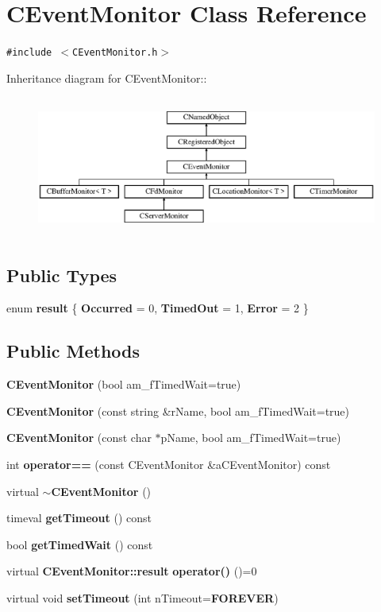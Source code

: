 \section{CEvent\-Monitor  Class Reference}
\label{classCEventMonitor}
{\tt \#include $<$CEvent\-Monitor.h$>$}

Inheritance diagram for CEvent\-Monitor::\begin{figure}[H]
\begin{center}
\leavevmode
\includegraphics[height=4.63576cm]{classCEventMonitor}
\end{center}
\end{figure}
\subsection*{Public Types}
\begin{CompactItemize}
\item 
enum {\bf result} \{ {\bf Occurred} =  0, 
{\bf Timed\-Out} =  1, 
{\bf Error} =  2
 \}
\end{CompactItemize}
\subsection*{Public Methods}
\begin{CompactItemize}
\item 
{\bf CEvent\-Monitor} (bool am\_\-f\-Timed\-Wait=true)
\item 
{\bf CEvent\-Monitor} (const string \&r\-Name, bool am\_\-f\-Timed\-Wait=true)
\item 
{\bf CEvent\-Monitor} (const char $\ast$p\-Name, bool am\_\-f\-Timed\-Wait=true)
\item 
int {\bf operator==} (const CEvent\-Monitor \&a\-CEvent\-Monitor) const
\item 
virtual {\bf $\sim$CEvent\-Monitor} ()
\item 
timeval {\bf get\-Timeout} () const
\item 
bool {\bf get\-Timed\-Wait} () const
\item 
virtual {\bf CEvent\-Monitor::result} {\bf operator()} ()=0
\item 
virtual void {\bf set\-Timeout} (int n\-Timeout={\bf FOREVER})
\end{CompactItemize}
